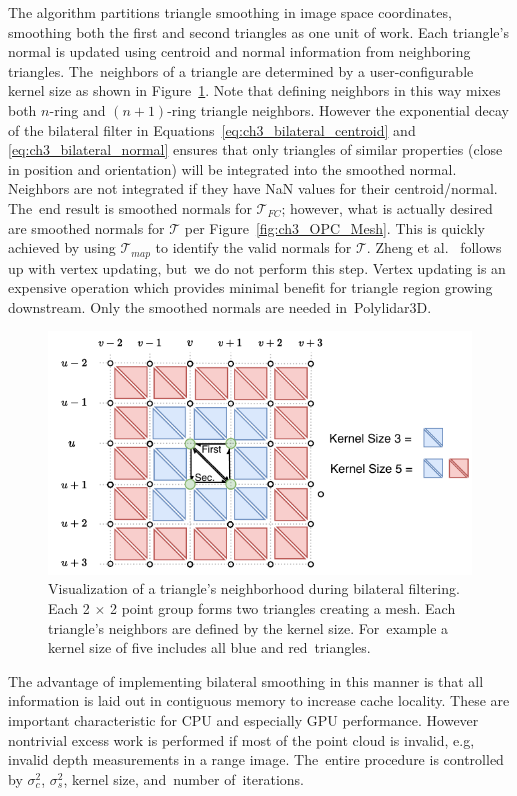 The algorithm partitions triangle smoothing in image space coordinates, smoothing both the first and second triangles as one unit of work. Each triangle's normal is updated using centroid and normal information from neighboring triangles. The~neighbors of a triangle are determined by a user-configurable kernel size as shown in Figure~\ref{fig:ch3_smooth_bilateral}.  Note that defining neighbors in this way mixes both $n$-ring and $(n+1)$-ring triangle neighbors. However the exponential decay of the bilateral filter in Equations~\ref{eq:ch3_bilateral_centroid} and \ref{eq:ch3_bilateral_normal} ensures that only triangles of similar properties (close in position and orientation) will be integrated into the smoothed normal. Neighbors are not integrated if they have NaN values for their centroid/normal. The~end result is smoothed normals for $\mathcal{T}_{FC}$; however, what is actually desired are smoothed normals for $\mathcal{T}$ per Figure~\ref{fig:ch3_OPC_Mesh}. This is quickly achieved by using $\mathcal{T}_{map}$ to identify the valid normals for $\mathcal{T}$. Zheng et al.~\cite{zheng_bilateral_2011} follows up with vertex updating, but~we do not perform this step. Vertex updating is an expensive operation which provides minimal benefit for triangle region growing downstream. Only the smoothed normals are needed in~Polylidar3D. 


\begin{figure}[H]
    \centering
    \includegraphics[width=.60\linewidth]{chapter_3_polylidar3d/imgs/OPCHalfEdge-BilateralFilter.pdf}
    \caption[Visualization of a triangle's neighborhood during bilateral filtering]{Visualization of a triangle's neighborhood during bilateral filtering.  Each 2 $\times$ 2 point group forms two triangles creating a mesh. Each triangle's neighbors are defined by the kernel size. For~example a kernel size of five includes all blue and red~triangles.}
    \label{fig:ch3_smooth_bilateral}
\end{figure}

The advantage of implementing bilateral smoothing in this manner is that all information is laid out in contiguous memory to increase cache locality. These are important characteristic for CPU and especially GPU performance. However nontrivial excess work is performed if most of the point cloud is invalid, e.g, invalid depth measurements in a range image. The~entire procedure is controlled by $\sigma_c^2$, $\sigma_s^2$, kernel size, and~number of~iterations.

